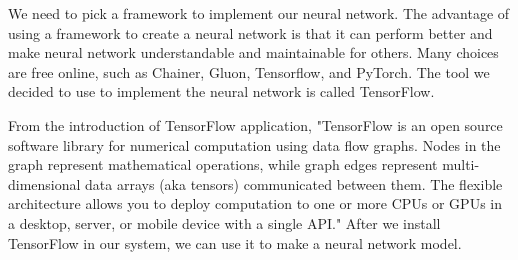 \documentclass[onecolumn, draftclsnofoot,10pt, compsoc]{IEEEtran}
\begin{document}
\par
We need to pick a framework to implement our neural network. The advantage of using a framework to create a neural network is that it can perform better and make neural network understandable and maintainable for others. Many choices are free online, such as Chainer, Gluon, Tensorflow, and PyTorch. The tool we decided to use to implement the neural network is called TensorFlow.
\par
From the introduction of TensorFlow application, "TensorFlow is an open source software library for numerical computation using data flow graphs. Nodes in the graph represent mathematical operations, while graph edges represent multi-dimensional data arrays (aka tensors) communicated between them. The flexible architecture allows you to deploy computation to one or more CPUs or GPUs in a desktop, server, or mobile device with a single API." After we install TensorFlow in our system, we can use it to make a neural network model.   
\pagebreak
\end{document}

